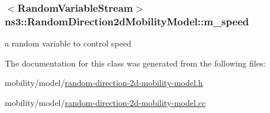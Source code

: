 \subsubsection[{\texorpdfstring{m\+\_\+speed}{m_speed}}]{$<${\bf Random\+Variable\+Stream}$>$ ns3\+::\+Random\+Direction2d\+Mobility\+Model\+::m\+\_\+speed\hspace{0.3cm}{\ttfamily [private]}}\hypertarget{classns3_1_1RandomDirection2dMobilityModel_aa227a9500fcbe1a7436a95c8f017ca94}{}\label{classns3_1_1RandomDirection2dMobilityModel_aa227a9500fcbe1a7436a95c8f017ca94}


a random variable to control speed 



The documentation for this class was generated from the following files\+:\begin{DoxyCompactItemize}
\item 
mobility/model/\hyperlink{random-direction-2d-mobility-model_8h}{random-\/direction-\/2d-\/mobility-\/model.\+h}\item 
mobility/model/\hyperlink{random-direction-2d-mobility-model_8cc}{random-\/direction-\/2d-\/mobility-\/model.\+cc}\end{DoxyCompactItemize}
